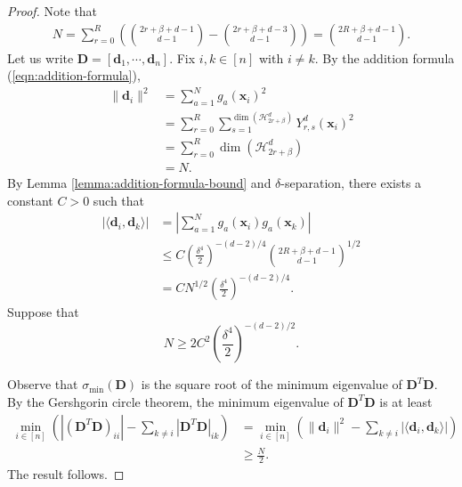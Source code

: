\documentclass{article}
\theoremstyle{definition}
\newcommand{\mc}{\mathcal}
\def\vd{{\bm{d}}}
\def\vx{{\bm{x}}}
\def\mD{{\bm{D}}}
\begin{document}
\begin{proof}
    Note that
    \begin{align*}
        N = \sum_{r = 0}^R \left(\binom{2r + \beta + d - 1}{d - 1} - \binom{2r + \beta + d - 3}{d - 1}  \right)
        = \binom{2R + \beta + d - 1}{d - 1}.
    \end{align*}
    Let us write $\mD = [\vd_1, \cdots, \vd_n]$. Fix $i, k \in [n]$ with $i \neq k$. By the addition formula (\ref{eqn:addition-formula}),
    \begin{align*}
        \|\vd_i\|^2 &= \sum_{a = 1}^N g_a(\vx_i)^2\\
        &= \sum_{r = 0}^R \sum_{s = 1}^{\dim(\mc{H}_{2r +\beta}^d) }Y_{r,s}^d(\vx_i)^2\\
        &= \sum_{r = 0}^R \dim(\mc{H}_{2r + \beta}^d)\\
        &= N.
    \end{align*}
     By Lemma \ref{lemma:addition-formula-bound} and $\delta$-separation, there exists a constant $C > 0$ such that 
     \begin{align*}
         |\langle \vd_i, \vd_k \rangle| &= \left|\sum_{a = 1}^N g_a(\vx_i)g_a(\vx_k)\right|\\
         &\leq C\left(\frac{\delta^4 }{2} \right)^{-(d-2)/4}\binom{2R + \beta + d - 1 }{d -1 }^{1/2}\\
         &= C N^{1/2}\left(\frac{\delta^4 }{2} \right)^{-(d-2)/4}.
     \end{align*}
     Suppose that 
     \[N \geq 2C^2\left(\frac{\delta^4}{2}\right)^{-(d - 2)/2}. \]
     
     Observe that $\sigma_{\min}(\mD)$ is the square root of the minimum eigenvalue of $\mD^T \mD$. By the Gershgorin circle theorem, the minimum eigenvalue of $\mD^T \mD$ is at least
    \begin{align*}
        \min_{i \in [n]}\left(|(\mD^T\mD)_{ii}| - \sum_{k \neq i}|\mD^T\mD|_{ik} \right) &= \min_{i \in [n]}\left(\|\vd_i\|^2 - \sum_{k \neq i}|\langle \vd_i, \vd_k \rangle|\right)\\
        &\geq \frac{N}{2}.
    \end{align*}
    The result follows.
\end{proof}
\end{document}

